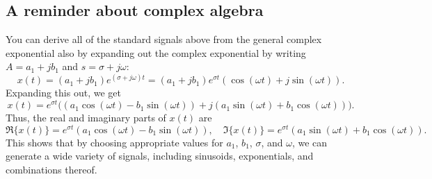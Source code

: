 \subsection{A reminder about complex algebra}
You can derive all of the standard signals above from the general complex exponential also by expanding out the complex exponential by writing $A = a_1 + j b_1$ and $s = \sigma + j\omega$:
\[
x(t) = (a_1 + j b_1) e^{(\sigma + j\omega) t} = (a_1 + j b_1) e^{\sigma t} (\cos(\omega t) + j \sin(\omega t)).
\]
Expanding this out, we get
\[
x(t) = e^{\sigma t} \big( (a_1 \cos(\omega t) - b_1 \sin(\omega t)) + j (a_1 \sin(\omega t) + b_1 \cos(\omega t)) \big).
\]
Thus, the real and imaginary parts of $x(t)$ are
\[
\Re\{x(t)\} = e^{\sigma t} (a_1 \cos(\omega t) - b_1 \sin(\omega t)), \quad \Im\{x(t)\} = e^{\sigma t} (a_1 \sin(\omega t) + b_1 \cos(\omega t)).
\]
This shows that by choosing appropriate values for $a_1$, $b_1$, $\sigma$, and $\omega$, we can generate a wide variety of signals, including sinusoids, exponentials, and combinations thereof.




